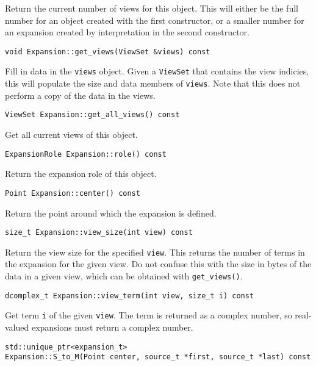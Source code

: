 Return the current number of views for this object. This will either be the
full number for an object created with the first constructor, or a smaller
number for an expansion created by interpretation in the second constructor.

\begin{lstlisting}
void Expansion::get_views(ViewSet &views) const
\end{lstlisting}


Fill in data in the \texttt{views} object. Given a \texttt{ViewSet} that
contains the view indicies, this will populate the size and data members of
\texttt{views}. Note that this does not perform a copy of the data in the
views.

\begin{lstlisting}
ViewSet Expansion::get_all_views() const
\end{lstlisting}


Get all current views of this object.

\begin{lstlisting}
ExpansionRole Expansion::role() const
\end{lstlisting}


Return the expansion role of this object.

\begin{lstlisting}
Point Expansion::center() const
\end{lstlisting}


Return the point around which the expansion is defined.

\begin{lstlisting}
size_t Expansion::view_size(int view) const
\end{lstlisting}


Return the view size for the specified \texttt{view}. This returns the number
of terms in the expansion for the given view. Do not confuse this with the
size in bytes of the data in a given view, which can be obtained with
\texttt{get\_views()}.

\begin{lstlisting}
dcomplex_t Expansion::view_term(int view, size_t i) const
\end{lstlisting}


Get term \texttt{i} of the given \texttt{view}. The term is returned as a
complex number, so real-valued expansions must return a complex number.

\begin{lstlisting}
std::unique_ptr<expansion_t> 
Expansion::S_to_M(Point center, source_t *first, source_t *last) const
\end{lstlisting}


